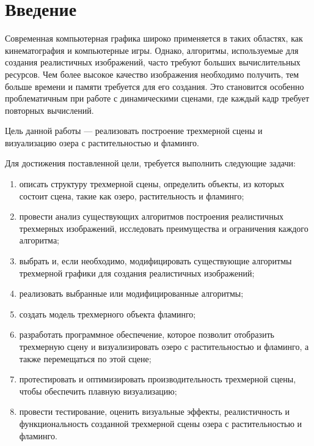 \chapter*{Введение}

Современная компьютерная графика широко применяется в таких областях, как кинематография и компьютерные игры. Однако, алгоритмы, используемые для создания реалистичных изображений, часто требуют больших вычислительных ресурсов. Чем более высокое качество изображения необходимо получить, тем больше времени и памяти требуется для его создания. Это становится особенно проблематичным при работе с динамическими сценами, где каждый кадр требует повторных вычислений.

Цель данной работы --- реализовать построение трехмерной сцены и визуализацию озера с растительностью и фламинго.

Для достижения поставленной цели, требуется выполнить следующие задачи:
\begin{enumerate}[label=\arabic*)]
	\item описать структуру трехмерной сцены, определить объекты, из которых состоит сцена, такие как озеро, растительность и фламинго;
	\item провести анализ существующих алгоритмов построения реалистичных трехмерных изображений, исследовать преимущества и ограничения каждого алгоритма;
	\item выбрать и, если необходимо, модифицировать существующие алгоритмы трехмерной графики для создания реалистичных изображений;
	\item реализовать выбранные или модифицированные алгоритмы;
	\item создать модель трехмерного объекта фламинго;
	\item разработать программное обеспечение, которое позволит отобразить трехмерную сцену и визуализировать озеро с растительностью и фламинго, а также перемещаться по этой сцене;
	\item протестировать и оптимизировать производительность трехмерной сцены, чтобы обеспечить плавную визуализацию;
	\item провести тестирование, оценить визуальные эффекты, реалистичность и функциональность созданной трехмерной сцены озера с растительностью и фламинго.
\end{enumerate} 